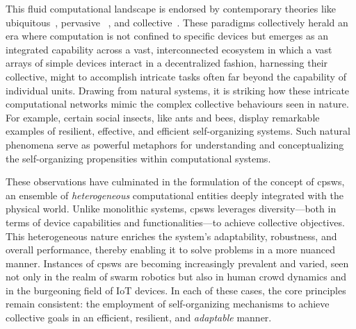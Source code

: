 This fluid computational landscape is endorsed by contemporary theories like  ubiquitous~\cite{DBLP:journals/sigmobile/Weiser99}, pervasive
 ~\cite{DBLP:journals/computer/SahaM03}, and collective~\cite{DBLP:journals/computer/Abowd16}.
%
These paradigms collectively herald an era where computation 
 is not confined to specific devices but emerges as an integrated capability across a vast, 
 interconnected ecosystem in which a vast arrays of simple devices interact in a decentralized fashion, 
 harnessing their collective, might to accomplish intricate tasks often far beyond the capability of individual units. 
%
Drawing from natural systems, 
 it is striking how these intricate computational networks mimic the complex collective behaviours seen in nature. 
 For example, certain social insects, like ants and bees, display remarkable examples of resilient, effective, and efficient self-organizing systems. 
 Such natural phenomena serve as powerful metaphors for understanding and conceptualizing the self-organizing propensities within computational systems.
 
These observations have culminated in the formulation of the concept of \acp{cpsw}, 
 an ensemble of \emph{heterogeneous} computational entities deeply integrated with the physical world. Unlike monolithic systems, \acp{cpsw} leverages diversity—both in terms of device capabilities and functionalities—to achieve collective objectives. 
 This heterogeneous nature enriches the system's adaptability, robustness, and overall performance, thereby enabling it to solve problems in a more nuanced manner.
%
Instances of \acp{cpsw} are becoming increasingly prevalent and varied, 
 seen not only in the realm of swarm robotics but also in human crowd dynamics and in the burgeoning field of IoT devices. 
 In each of these cases, the core principles remain consistent: the employment of self-organizing mechanisms to achieve collective goals in an efficient, resilient, and \emph{adaptable} manner.

